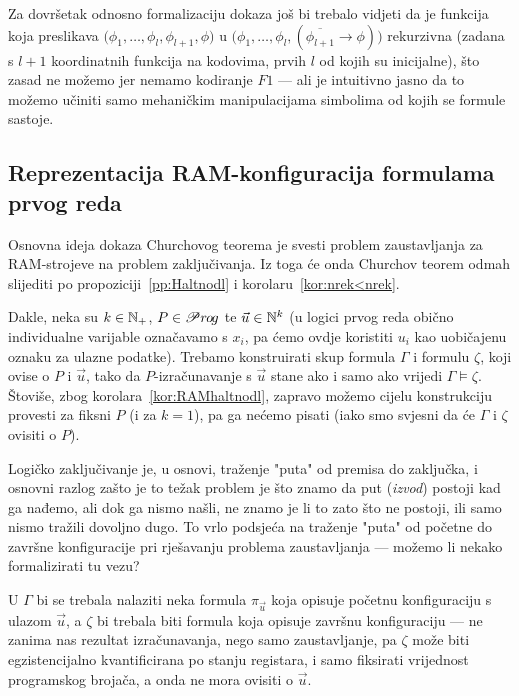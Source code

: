 Za dovršetak odnosno formalizaciju dokaza još bi trebalo vidjeti da je funkcija koja preslikava $\bigl(\phi_1,\dotsc,\phi_l,\phi_{l+1},\phi\bigr)$ u $\bigl(\phi_1,\dotsc,\phi_l,(\overline{\phi_{l+1}}\to\phi)\bigr)$ rekurzivna (zadana s $l+1$ koordinatnih funkcija na kodovima, prvih $l$ od kojih su inicijalne), što zasad ne možemo jer nemamo kodiranje $F1$ --- ali je intuitivno jasno da to možemo učiniti samo mehaničkim manipulacijama simbolima od kojih se formule sastoje.

\subsection{Reprezentacija RAM-konfiguracija formulama prvog reda}

Osnovna ideja dokaza Churchovog teorema je svesti problem zaustavljanja za RAM-strojeve na problem zaključivanja. Iz toga će onda Churchov teorem odmah slijediti po propoziciji~\ref{pp:Haltnodl} i korolaru~\ref{kor:nrek<nrek}.

Dakle, neka su $k\in{\mathbb N}_+$, $P\in\mathscr Pr\mspace{-1mu}o\mspace{-2mu}g$ te $\vec u\in{\mathbb N}^k$ (u logici prvog reda obično individualne varijable označavamo s $x_i$, pa ćemo ovdje koristiti $u_i$ kao uobičajenu oznaku za ulazne podatke). Trebamo konstruirati skup formula $\Gamma$ i formulu $\zeta$, koji ovise o $P$ i $\vec u$, tako da $P$-izračunavanje s $\vec u$ stane ako i samo ako vrijedi $\Gamma\models\zeta$. Štoviše, zbog korolara~\ref{kor:RAMhaltnodl}, zapravo možemo cijelu konstrukciju provesti za fiksni $P$ (i za $k=1$), pa ga nećemo pisati (iako smo svjesni da će $\Gamma$ i $\zeta$ ovisiti o $P$).

Logičko zaključivanje je, u osnovi, traženje "puta" od premisa do zaključka, i osnovni razlog zašto je to težak problem je što znamo da put (\hspace{-1pt}\emph{izvod}) postoji kad ga nađemo, ali dok ga nismo našli, ne znamo je li to zato što ne postoji, ili samo nismo tražili dovoljno dugo. To vrlo podsjeća na traženje "puta" od početne do završne konfiguracije pri rješavanju problema zaustavljanja --- možemo li nekako formalizirati tu vezu?

U $\Gamma$ bi se trebala nalaziti neka formula $\pi_{\vec u}$ koja opisuje početnu konfiguraciju s ulazom $\vec u$, a $\zeta$ bi trebala biti formula koja opisuje završnu konfiguraciju --- ne zanima nas rezultat izračunavanja, nego samo zaustavljanje, pa $\zeta$ može biti egzistencijalno kvantificirana po stanju registara, i samo fiksirati vrijednost programskog brojača, a onda ne mora ovisiti o $\vec u$.

